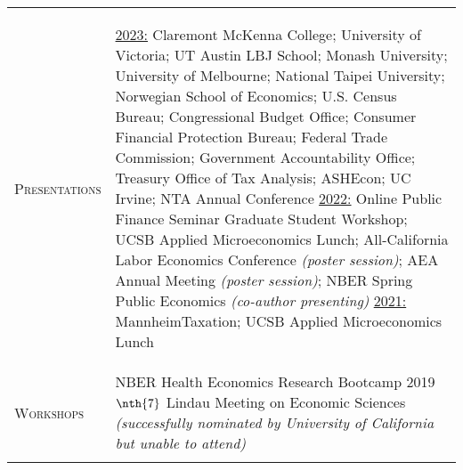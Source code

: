 \documentclass[11pt]{article}
\newcommand{\xspace}{23pt}
\begin{document}
\begin{tabularx}{\textwidth}{@{}Y Z@{}}
	\textsc{Presentations} & 
	\begin{minipage}[t]{1.55\linewidth}	
		\begin{flushleft}
			\uline{2023:} Claremont McKenna College; University of Victoria; UT Austin LBJ School; Monash University; University of Melbourne; National Taipei University; Norwegian School of Economics; U.S. Census Bureau; Congressional Budget Office; Consumer Financial Protection Bureau; Federal Trade Commission; Government Accountability Office; Treasury Office of Tax Analysis; ASHEcon; UC Irvine; NTA Annual Conference%
			\vspace{10pt} \newline
			\uline{2022:} Online Public Finance Seminar Graduate Student Workshop; UCSB Applied Microeconomics Lunch; All-California Labor Economics Conference \textit{(poster session)}; AEA Annual Meeting \textit{(poster session)}; NBER Spring Public Economics \textit{(co-author presenting)}
			\vspace{10pt} \newline
			\uline{2021:} MannheimTaxation; UCSB Applied Microeconomics Lunch
		\end{flushleft}
	\end{minipage}
	\\ \addlinespace[\xspace] 
	
	\textsc{Workshops} & 
	NBER Health Economics Research Bootcamp \hfill 2019%
	\vspace{10pt} \newline
	$\nth{7}$ Lindau Meeting on Economic Sciences \newline \textit{(successfully nominated by University of California but unable to attend)} 
	\\ \addlinespace[\xspace] 
	

\end{tabularx}
\end{document}
